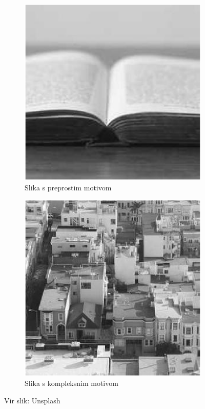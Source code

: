\begin{figure}
    \begin{subfigure}{0.5\linewidth}
        \includegraphics[width=\linewidth]{Poglavja/Slike/kompleksnost/preprosta grayscale 300/knjiga.png}
        \caption{Slika s preprostim motivom}
    \end{subfigure}
    \hfill
    \begin{subfigure}{0.5\linewidth}
        \includegraphics[width=\linewidth]{Poglavja/Slike/kompleksnost/kompleksna grayscale 300/mesto.png}
        \caption{Slika s kompleksnim motivom}
    \end{subfigure}
    \caption{Vir slik: Unsplash}
\end{figure}

